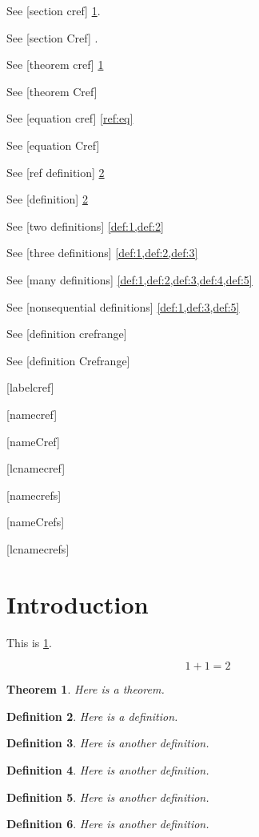 \documentclass{amsart}
\newtheorem{theorem}{Theorem}
\newtheorem{definition}[theorem]{Definition}
\begin{document}
See [section cref] \cref{sec:intro}.

See [section Cref] .

See [theorem cref] \cref{thm:1}

See [theorem Cref] 

See [equation cref] \cref{ref:eq}

See [equation Cref] 

See [ref definition] \ref{def:1}

See [definition] \cref{def:1}

See [two definitions] \cref{def:1,def:2}

See [three definitions] \cref{def:1,def:2,def:3}

See [many definitions] \cref{def:1,def:2,def:3,def:4,def:5}

See [nonsequential definitions] \cref{def:1,def:3,def:5}

See [definition crefrange] 

See [definition Crefrange] 

[labelcref] 

[namecref] 

[nameCref] 

[lcnamecref] 

[namecrefs] 

[nameCrefs] 

[lcnamecrefs] 

\section{Introduction}
\label{sec:intro}

This is \cref{sec:intro}.

\begin{equation}
\label{ref:eq}
1 + 1 = 2
\end{equation}

\begin{theorem}\label{thm:1}
Here is a theorem.
\end{theorem}

\begin{definition}
\label{def:1}
Here is a definition.
\end{definition}

\begin{definition}
\label{def:2}
Here is another definition.
\end{definition}

\begin{definition}
\label{def:3}
Here is another definition.
\end{definition}

\begin{definition}
\label{def:4}
Here is another definition.
\end{definition}

\begin{definition}
\label{def:5}
Here is another definition.
\end{definition}
\end{document}
